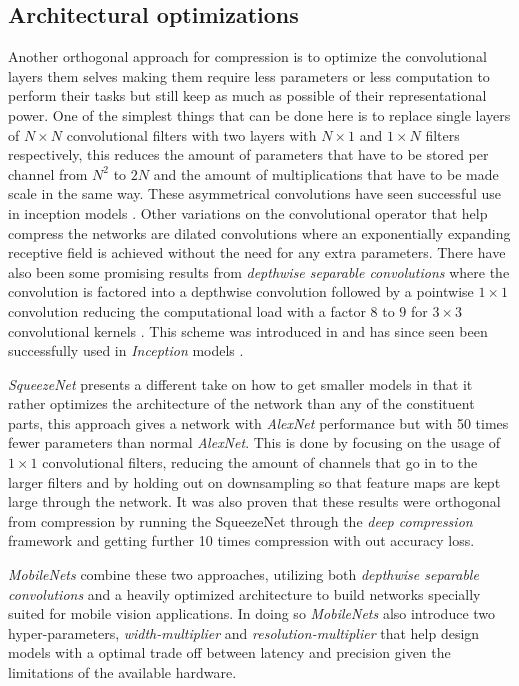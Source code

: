 \documentclass{kththesis}
\newcommand{\bibentry}[1]{\parencite{#1}}
\begin{document}
\subsection{Architectural optimizations}
Another orthogonal approach for compression is to optimize the convolutional layers them selves making them require less parameters or less computation to perform their tasks but still keep as much as possible of their representational power. One of the simplest things that can be done here is to replace single layers of \(N \times N\) convolutional filters with two layers with \(N \times 1\) and \(1 \times N\) filters respectively, this reduces the amount of parameters that have to be stored per channel from \(N^2\) to \(2N\) and the amount of multiplications that have to be made scale in the same way. These asymmetrical convolutions have seen successful use in inception models \bibentry{szegedy2016rethinking}. 
Other variations on the convolutional operator that help compress the networks are dilated convolutions \bibentry{yu2015multi} where an exponentially expanding receptive field is achieved without the need for any extra parameters. There have also been some promising results from \emph{depthwise separable convolutions} where the convolution is factored into a depthwise convolution followed by a pointwise \(1 \times 1\) convolution reducing the computational load with a factor \(8\) to \(9\) for \(3 \times 3\) convolutional kernels \bibentry{howard2017mobilenets}. This scheme was introduced in \bibentry{sifre2014rigid} and has since seen been successfully used in \emph{Inception} models \bibentry{ioffe2015batch}. 

\emph{SqueezeNet} \bibentry{iandola2016squeezenet} presents a different take on how to get smaller models in that it rather optimizes the architecture of the network than any of the constituent parts, this approach gives a network with \emph{AlexNet} performance but with 50 times fewer parameters than normal \emph{AlexNet}. This is done by focusing on the usage of \(1 \times 1\) convolutional filters, reducing the amount of channels that go in to the larger filters and by holding out on downsampling so that feature maps are kept large through the network. It was also proven that these results were orthogonal from compression by running the SqueezeNet through the \emph{deep compression} framework \bibentry{han2015deep} and getting further 10 times compression with out accuracy loss.

\emph{MobileNets} \bibentry{howard2017mobilenets} combine these two approaches, utilizing both \emph{depthwise separable convolutions} and a heavily optimized architecture to build networks specially suited for mobile vision applications. In doing so \emph{MobileNets} also introduce two hyper-parameters, \emph{width-multiplier} and \emph{resolution-multiplier} that help design models with a optimal trade off between latency and precision given the limitations of the available hardware.
\end{document}
